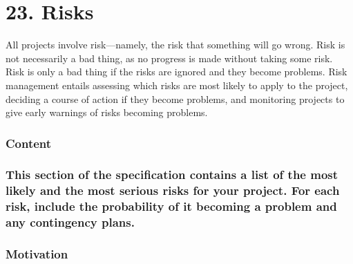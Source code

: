 \documentclass[
]{article}
\begin{document}
\hypertarget{section-38}{%
\subsubsection{}\label{section-38}}

\hypertarget{risks}{%
\section{23. Risks}\label{risks}}

All projects involve risk---namely, the risk that something will go
wrong. Risk is not necessarily a bad thing, as no progress is made
without taking some risk. Risk is only a bad thing if the risks are
ignored and they become problems. Risk management entails assessing
which risks are most likely to apply to the project, deciding a course
of action if they become problems, and monitoring projects to give early
warnings of risks becoming problems.

\hypertarget{content-73}{%
\subsubsection{Content}\label{content-73}}

\hypertarget{this-section-of-the-specification-contains-a-list-of-the-most-likely-and-the-most-serious-risks-for-your-project.-for-each-risk-include-the-probability-of-it-becoming-a-problem-and-any-contingency-plans.}{%
\subsubsection{\texorpdfstring{This section of the specification
contains a list of the most likely and the most serious risks for your
project. For each risk, include the probability of it becoming a problem
and any contingency plans.
}{This section of the specification contains a list of the most likely and the most serious risks for your project. For each risk, include the probability of it becoming a problem and any contingency plans. }}\label{this-section-of-the-specification-contains-a-list-of-the-most-likely-and-the-most-serious-risks-for-your-project.-for-each-risk-include-the-probability-of-it-becoming-a-problem-and-any-contingency-plans.}}

\hypertarget{motivation-72}{%
\subsubsection{Motivation}\label{motivation-72}}
\end{document}

